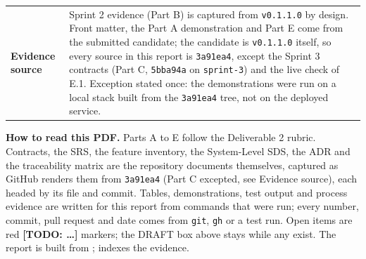 \begin{tabular}{@{}p{3.9cm}p{12.4cm}@{}}
\textbf{Evidence source} & Sprint 2 evidence (Part B) is captured from \texttt{v0.1.1.0} by design. Front matter, the Part A demonstration and Part E come from the submitted candidate; the candidate is \texttt{v0.1.1.0} itself, so every source in this report is \texttt{3a91ea4}, except the Sprint 3 contracts (Part C, \texttt{5bba94a} on \texttt{sprint-3}) and the live check of E.1. Exception stated once: the demonstrations were run on a local stack built from the \texttt{3a91ea4} tree, not on the deployed service. \\
\end{tabular}

\medskip
\noindent\textbf{How to read this PDF.}
Parts A to E follow the Deliverable 2 rubric. Contracts, the SRS, the feature inventory, the System-Level SDS, the ADR and the traceability matrix are the repository documents themselves, captured as GitHub renders them from \texttt{3a91ea4} (Part C excepted, see Evidence source), each headed by its file and commit.
Tables, demonstrations, test output and process evidence are written for this report from commands that were run; every number, commit, pull request and date comes from \texttt{git}, \texttt{gh} or a test run.
Open items are red \textbf{[TODO: \ldots]} markers; the DRAFT box above stays while any exist.
The report is built from ;  indexes the evidence.

\clearpage
